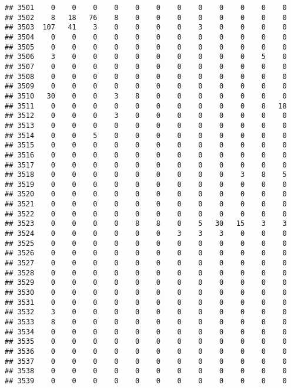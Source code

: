 \documentclass[]{article}
\begin{document}
\begin{verbatim}
## 3501    0    0    0    0    0    0    0    0    0    0    0    0
## 3502    8   18   76    8    0    0    0    0    0    0    0    0
## 3503  107   41    3    0    0    0    0    3    0    0    0    0
## 3504    0    0    0    0    0    0    0    0    0    0    0    0
## 3505    0    0    0    0    0    0    0    0    0    0    0    0
## 3506    3    0    0    0    0    0    0    0    0    0    5    0
## 3507    0    0    0    0    0    0    0    0    0    0    0    0
## 3508    0    0    0    0    0    0    0    0    0    0    0    0
## 3509    0    0    0    0    0    0    0    0    0    0    0    0
## 3510   30    0    0    3    8    0    0    0    0    0    0    0
## 3511    0    0    0    0    0    0    0    0    0    0    8   18
## 3512    0    0    0    3    0    0    0    0    0    0    0    0
## 3513    0    0    0    0    0    0    0    0    0    0    0    0
## 3514    0    0    5    0    0    0    0    0    0    0    0    0
## 3515    0    0    0    0    0    0    0    0    0    0    0    0
## 3516    0    0    0    0    0    0    0    0    0    0    0    0
## 3517    0    0    0    0    0    0    0    0    0    0    0    0
## 3518    0    0    0    0    0    0    0    0    0    3    8    5
## 3519    0    0    0    0    0    0    0    0    0    0    0    0
## 3520    0    0    0    0    0    0    0    0    0    0    0    0
## 3521    0    0    0    0    0    0    0    0    0    0    0    0
## 3522    0    0    0    0    0    0    0    0    0    0    0    0
## 3523    0    0    0    0    8    8    0    5   30   15    3    3
## 3524    0    0    0    0    0    0    3    3    3    0    0    0
## 3525    0    0    0    0    0    0    0    0    0    0    0    0
## 3526    0    0    0    0    0    0    0    0    0    0    0    0
## 3527    0    0    0    0    0    0    0    0    0    0    0    0
## 3528    0    0    0    0    0    0    0    0    0    0    0    0
## 3529    0    0    0    0    0    0    0    0    0    0    0    0
## 3530    0    0    0    0    0    0    0    0    0    0    0    0
## 3531    0    0    0    0    0    0    0    0    0    0    0    0
## 3532    3    0    0    0    0    0    0    0    0    0    0    0
## 3533    8    0    0    0    0    0    0    0    0    0    0    0
## 3534    0    0    0    0    0    0    0    0    0    0    0    0
## 3535    0    0    0    0    0    0    0    0    0    0    0    0
## 3536    0    0    0    0    0    0    0    0    0    0    0    0
## 3537    0    0    0    0    0    0    0    0    0    0    0    0
## 3538    0    0    0    0    0    0    0    0    0    0    0    0
## 3539    0    0    0    0    0    0    0    0    0    0    0    0

\end{verbatim}
\end{document}
